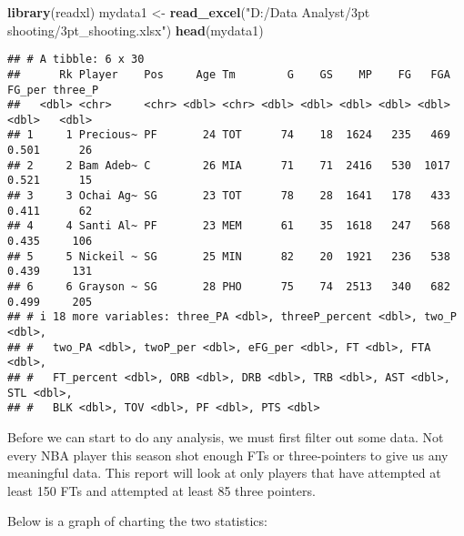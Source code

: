 \documentclass[
]{article}
\newenvironment{Shaded}{\begin{snugshade}}{\end{snugshade}}
\newcommand{\AttributeTok}[1]{\textcolor[rgb]{0.13,0.29,0.53}{#1}}
\newcommand{\DecValTok}[1]{\textcolor[rgb]{0.00,0.00,0.81}{#1}}
\newcommand{\FunctionTok}[1]{\textcolor[rgb]{0.13,0.29,0.53}{\textbf{#1}}}
\newcommand{\NormalTok}[1]{#1}
\newcommand{\OtherTok}[1]{\textcolor[rgb]{0.56,0.35,0.01}{#1}}
\newcommand{\SpecialCharTok}[1]{\textcolor[rgb]{0.81,0.36,0.00}{\textbf{#1}}}
\newcommand{\StringTok}[1]{\textcolor[rgb]{0.31,0.60,0.02}{#1}}
\begin{document}
\begin{Shaded}
\begin{Highlighting}[]
\FunctionTok{library}\NormalTok{(readxl)}
\NormalTok{mydata1 }\OtherTok{\textless{}{-}} \FunctionTok{read\_excel}\NormalTok{(}\StringTok{"D:/Data Analyst/3pt shooting/3pt\_shooting.xlsx"}\NormalTok{)}
\FunctionTok{head}\NormalTok{(mydata1)}
\end{Highlighting}
\end{Shaded}

\begin{verbatim}
## # A tibble: 6 x 30
##      Rk Player    Pos     Age Tm        G    GS    MP    FG   FGA FG_per three_P
##   <dbl> <chr>     <chr> <dbl> <chr> <dbl> <dbl> <dbl> <dbl> <dbl>  <dbl>   <dbl>
## 1     1 Precious~ PF       24 TOT      74    18  1624   235   469  0.501      26
## 2     2 Bam Adeb~ C        26 MIA      71    71  2416   530  1017  0.521      15
## 3     3 Ochai Ag~ SG       23 TOT      78    28  1641   178   433  0.411      62
## 4     4 Santi Al~ PF       23 MEM      61    35  1618   247   568  0.435     106
## 5     5 Nickeil ~ SG       25 MIN      82    20  1921   236   538  0.439     131
## 6     6 Grayson ~ SG       28 PHO      75    74  2513   340   682  0.499     205
## # i 18 more variables: three_PA <dbl>, threeP_percent <dbl>, two_P <dbl>,
## #   two_PA <dbl>, twoP_per <dbl>, eFG_per <dbl>, FT <dbl>, FTA <dbl>,
## #   FT_percent <dbl>, ORB <dbl>, DRB <dbl>, TRB <dbl>, AST <dbl>, STL <dbl>,
## #   BLK <dbl>, TOV <dbl>, PF <dbl>, PTS <dbl>
\end{verbatim}

Before we can start to do any analysis, we must first filter out some
data. Not every NBA player this season shot enough FTs or three-pointers
to give us any meaningful data. This report will look at only players
that have attempted at least 150 FTs and attempted at least 85 three
pointers.

Below is a graph of charting the two statistics:

\begin{Shaded}
\end{Shaded}
\end{document}
